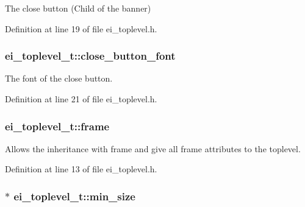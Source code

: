 The close button (Child of the banner) 



Definition at line 19 of file ei\+\_\+toplevel.\+h.

\hypertarget{structei__toplevel__t_aec35a67c16125a0aa3adf345f1c597a9}{
\subsubsection[{close\+\_\+button\+\_\+font}]{ ei\+\_\+toplevel\+\_\+t\+::close\+\_\+button\+\_\+font}}\label{structei__toplevel__t_aec35a67c16125a0aa3adf345f1c597a9}


The font of the close button. 



Definition at line 21 of file ei\+\_\+toplevel.\+h.

\hypertarget{structei__toplevel__t_a03509f8ae2983cc3777569d7e10deae6}{
\subsubsection[{frame}]{ ei\+\_\+toplevel\+\_\+t\+::frame}}\label{structei__toplevel__t_a03509f8ae2983cc3777569d7e10deae6}


Allows the inheritance with frame and give all frame attributes to the toplevel. 



Definition at line 13 of file ei\+\_\+toplevel.\+h.

\hypertarget{structei__toplevel__t_a0eda3e2e2012df72477221731a6c2bd3}{
\subsubsection[{min\+\_\+size}]{$\ast$ ei\+\_\+toplevel\+\_\+t\+::min\+\_\+size}}\label{structei__toplevel__t_a0eda3e2e2012df72477221731a6c2bd3}


